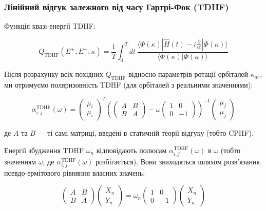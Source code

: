 \documentclass{PySCFBook}
\begin{document}
\subsubsection{Лінійний відгук залежного від часу Гартрі-Фок (TDHF)}

Функція квазі-енергії TDHF:

\[Q_{\text{TDHF}}(E^+, E^-; \kappa) = \frac{1}{T} \int_0^T dt \, \frac{\langle \Phi(\kappa) | \hat{H}(t) - i \frac{\partial}{\partial t} | \Phi(\kappa) \rangle}{\langle \Phi(\kappa) | \Phi(\kappa) \rangle}\]

Після розрахунку всіх похідних \(Q_{\text{TDHF}}\) відносно параметрів ротації орбіталей \(\kappa_{ar}\), ми отримуємо поляризовність TDHF (для орбіталей з реальними значеннями):

\[\alpha_{i,j}^{\text{TDHF}}(\omega) = \begin{pmatrix} \mu_i \\ \mu_i \end{pmatrix}^T \left( \begin{pmatrix} A & B \\ B & A \end{pmatrix} - \omega \begin{pmatrix} 1 & 0 \\ 0 & -1 \end{pmatrix} \right)^{-1} \begin{pmatrix} \mu_j \\ \mu_j \end{pmatrix}\]

де \(A\) та \(B\) — ті самі матриці, введені в статичній теорії відгуку (тобто CPHF).

Енергії збудження TDHF \(\omega_n\) відповідають полюсам \(\alpha_{i,j}^{\text{TDHF}}(\omega)\) в \(\omega\) (тобто значенням \(\omega\), де \(\alpha_{i,j}^{\text{TDHF}}(\omega)\) розбігається). Вони знаходяться шляхом розв'язання псевдо-ермітового рівняння власних значень:

\[\begin{pmatrix} A & B \\ B & A \end{pmatrix} \begin{pmatrix} X_n \\ Y_n \end{pmatrix} = \omega_n \begin{pmatrix} 1 & 0 \\ 0 & -1 \end{pmatrix} \begin{pmatrix} X_n \\ Y_n \end{pmatrix}\]
\end{document}
